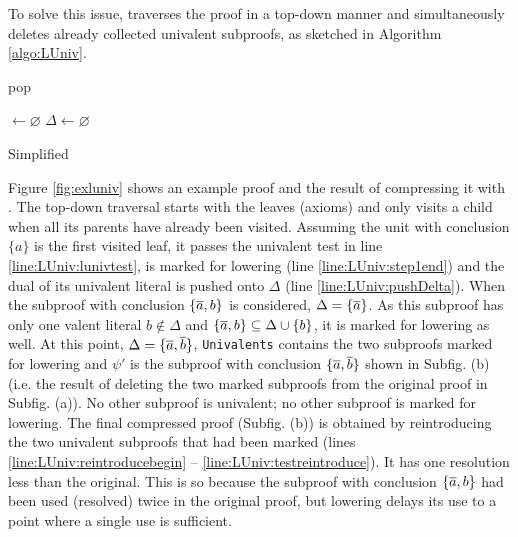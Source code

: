 \documentclass{easychair}
\begin{document}
To solve this issue, {\LowerUnivalents} traverses the proof in a top-down manner and simultaneously
deletes already collected univalent subproofs, as sketched in Algorithm \ref{algo:LUniv}.  


\begin{algorithm}[bt]
  \BlankLine

   {pop}

  \Univ $\leftarrow \varnothing$ \;
  $\Delta \leftarrow \varnothing$ \;
  \BlankLine

  \BlankLine


  \caption{Simplified \LowerUnivalents}
  \label{algo:LUniv}
\end{algorithm}


Figure \ref{fig:exluniv} shows an example proof and the result of compressing it with \LowerUnivalents. The top-down traversal starts with the leaves (axioms) and only visits a child when all its parents have already been visited. Assuming the unit with conclusion $\{a\}$ is the first visited leaf, it passes the univalent test in line \ref{line:LUniv:lunivtest}, is marked for lowering (line \ref{line:LUniv:step1end}) and the dual of its univalent literal is pushed onto $\Delta$ (line \ref{line:LUniv:pushDelta}). When the subproof with
conclusion $\{\overline{a},b\}$ is considered, $\Delta = \{\overline{a}\}$. As this subproof has only one
valent literal $b \notin \Delta$ and $\{\overline{a},b\} \subseteq \Delta \cup \{b\}$, it is
marked for lowering as well. At this point, $\Delta = \{\overline{a}, \overline{b}\}$, \texttt{Univalents} contains the two subproofs marked for lowering and $\psi'$ is the subproof with conclusion $\{\overline{a}, \overline{b}\}$ shown in Subfig. (b) (i.e. the result of deleting the two marked subproofs from the original proof in Subfig. (a)). No other subproof is univalent; no other subproof is marked for lowering. The final compressed proof (Subfig. (b)) is obtained by reintroducing the two univalent subproofs that had been marked (lines \ref{line:LUniv:reintroducebegin} -- \ref{line:LUniv:testreintroduce}). It has one resolution less than the original. This is so because the subproof with conclusion $\{\overline{a},b\}$ had been used (resolved) twice in the original proof, but lowering delays its use to a point where a single use is sufficient.
\end{document}
